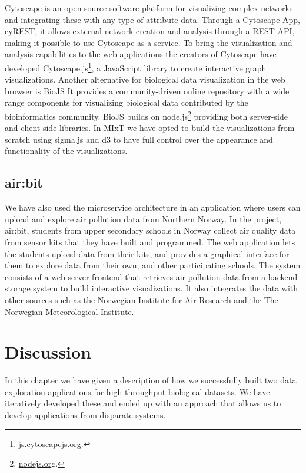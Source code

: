 Cytoscape is an open source software platform for visualizing complex networks
and integrating these with any type of attribute
data.\cite{shannon2003cytoscape} Through a Cytoscape App, cyREST, it allows
external network creation and analysis through a REST API\cite{ono2015cyrest},
making it possible to use Cytoscape as a service.  To bring the visualization
and analysis capabilities to the web applications the creators of Cytoscape have
developed Cytoscape.js\footnote{\url{js.cytoscapejs.org}.}, a JavaScript library
to create interactive graph visualizations.  Another alternative for biological
data visualization in the web browser is BioJS It provides a community-driven
online repository with a wide range components for visualizing biological data
contributed by the bioinformatics community.\cite{gomez2013biojs} BioJS builds
on node.js\footnote{\url{nodejs.org}.} providing both server-side and
client-side libraries. In MIxT we have opted to build the visualizations from
scratch using sigma.js and d3 to have full control over the appearance and
functionality of the visualizations. 

\subsection{air:bit}
We have also used the microservice architecture in an application where users
can upload and explore air pollution data from Northern
Norway.\cite{fjukstad2018low} In the project, air:bit, students from upper
secondary schools in Norway collect air quality data from sensor kits that they
have built and programmed. The web application lets the students upload data
from their kits, and provides a graphical interface for them to explore data
from their own, and other participating schools. The system consists of a web
server frontend that retrieves air pollution data from a backend storage system
to build interactive visualizations. It also integrates the data with other
sources such as the Norwegian Institute for Air Research and the The Norwegian
Meteorological Institute. 

\section{Discussion}
In this chapter we have given a description of how we successfully built two
data exploration applications for high-throughput biological datasets. We have
iteratively developed these and ended up with an approach that allows us to
develop applications from disparate systems. 

